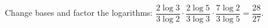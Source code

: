 Change bases and factor the logarithms: $\dfrac{2\log3}{3\log2}\cdot\dfrac{2\log5}{3\log3}\cdot\dfrac{7\log2}{3\log5}=\boxed{\dfrac{28}{27}}$.
